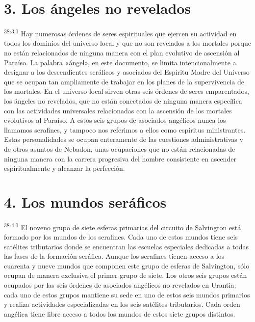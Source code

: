 \section*{3. Los ángeles no revelados}
\par
\textsuperscript{38:3.1} Hay numerosas órdenes de seres espirituales que ejercen su actividad en todos los dominios del universo local y que no son revelados a los mortales porque no están relacionados de ninguna manera con el plan evolutivo de ascensión al Paraíso. La palabra «ángel», en este documento, se limita intencionalmente a designar a los descendientes seráficos y asociados del Espíritu Madre del Universo que se ocupan tan ampliamente de trabajar en los planes de la supervivencia de los mortales. En el universo local sirven otras seis órdenes de seres emparentados, los ángeles no revelados, que no están conectados de ninguna manera específica con las actividades universales relacionadas con la ascensión de los mortales evolutivos al Paraíso. A estos seis grupos de asociados angélicos nunca los llamamos serafines, y tampoco nos referimos a ellos como espíritus ministrantes. Estas personalidades se ocupan enteramente de las cuestiones administrativas y de otros asuntos de Nebadon, unas ocupaciones que no están relacionadas de ninguna manera con la carrera progresiva del hombre consistente en ascender espiritualmente y alcanzar la perfección.

\section*{4. Los mundos seráficos}
\par
\textsuperscript{38:4.1} El noveno grupo de siete esferas primarias del circuito de Salvington está formado por los mundos de los serafines. Cada uno de estos mundos tiene seis satélites tributarios donde se encuentran las escuelas especiales dedicadas a todas las fases de la formación seráfica. Aunque los serafines tienen acceso a los cuarenta y nueve mundos que componen este grupo de esferas de Salvington, sólo ocupan de manera exclusiva el primer grupo de siete. Los otros seis grupos están ocupados por las seis órdenes de asociados angélicos no revelados en Urantia; cada uno de estos grupos mantiene su sede en uno de estos seis mundos primarios y realiza actividades especializadas en los seis satélites tributarios. Cada orden angélica tiene libre acceso a todos los mundos de estos siete grupos distintos.

